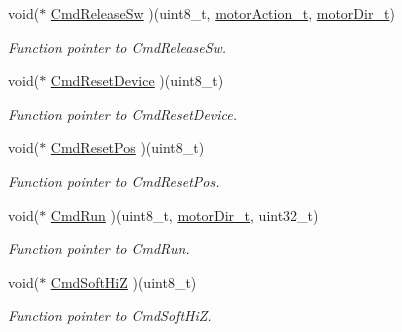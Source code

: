 \begin{DoxyCompactItemize}
void($\ast$ \mbox{\hyperlink{structmotor_drv__t_ada75b962899a05b4640740bcfe0a2fcf}{Cmd\+Release\+Sw}} )(uint8\+\_\+t, \mbox{\hyperlink{group___device___action___options_ga5b2358a9ba8742cb555ddc5b37508500}{motor\+Action\+\_\+t}}, \mbox{\hyperlink{group___device___direction___options_ga4eaf4196e4d11d552f58f3fab218a8c7}{motor\+Dir\+\_\+t}})
\begin{DoxyCompactList}\small\item\em Function pointer to Cmd\+Release\+Sw. \end{DoxyCompactList}\item 
\mbox{\label{structmotor_drv__t_aec6facd87e38580e0a4fc80fce33e9e1}} 
void($\ast$ \mbox{\hyperlink{structmotor_drv__t_aec6facd87e38580e0a4fc80fce33e9e1}{Cmd\+Reset\+Device}} )(uint8\+\_\+t)
\begin{DoxyCompactList}\small\item\em Function pointer to Cmd\+Reset\+Device. \end{DoxyCompactList}\item 
\mbox{\label{structmotor_drv__t_ad25f4e4ffb3dbb8d9c2732427bcab147}} 
void($\ast$ \mbox{\hyperlink{structmotor_drv__t_ad25f4e4ffb3dbb8d9c2732427bcab147}{Cmd\+Reset\+Pos}} )(uint8\+\_\+t)
\begin{DoxyCompactList}\small\item\em Function pointer to Cmd\+Reset\+Pos. \end{DoxyCompactList}\item 
\mbox{\label{structmotor_drv__t_a0cfc5dcf03d899294256637f765b11e7}} 
void($\ast$ \mbox{\hyperlink{structmotor_drv__t_a0cfc5dcf03d899294256637f765b11e7}{Cmd\+Run}} )(uint8\+\_\+t, \mbox{\hyperlink{group___device___direction___options_ga4eaf4196e4d11d552f58f3fab218a8c7}{motor\+Dir\+\_\+t}}, uint32\+\_\+t)
\begin{DoxyCompactList}\small\item\em Function pointer to Cmd\+Run. \end{DoxyCompactList}\item 
\mbox{\label{structmotor_drv__t_abd2f682491ffda6fc162307bff9e79ae}} 
void($\ast$ \mbox{\hyperlink{structmotor_drv__t_abd2f682491ffda6fc162307bff9e79ae}{Cmd\+Soft\+HiZ}} )(uint8\+\_\+t)
\begin{DoxyCompactList}\small\item\em Function pointer to Cmd\+Soft\+HiZ. \end{DoxyCompactList}\item 

\end{DoxyCompactItemize}
